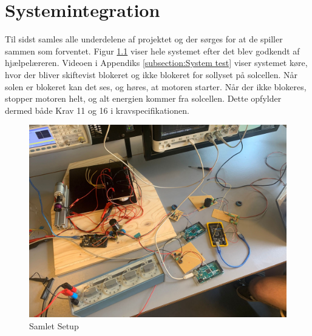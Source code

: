 \documentclass[../main.tex]{subfiles}
\begin{document}
\chapter{Systemintegration} \label{Chap:Systemintegration}
Til sidst samles alle underdelene af projektet og der sørges for at de spiller sammen som forventet. Figur \ref{fig: Samlet Setup} viser hele systemet efter det blev godkendt af hjælpelæreren. Videoen i Appendiks \ref{subsection:System test} viser systemet køre, hvor der bliver skiftevist blokeret og ikke blokeret for sollyset på solcellen. Når solen er blokeret kan det ses, og høres, at motoren starter. Når der ikke blokeres, stopper motoren helt, og alt energien kommer fra solcellen. Dette opfylder dermed både Krav 11 og 16 i kravspecifikationen. 

\begin{figure}[H]
      \includegraphics[width=\textwidth]{Dokumentation/Pictures/Total Setup.jpg}
     \caption{Samlet Setup}
     \label{fig: Samlet Setup}
     \end{figure}
\end{document}
